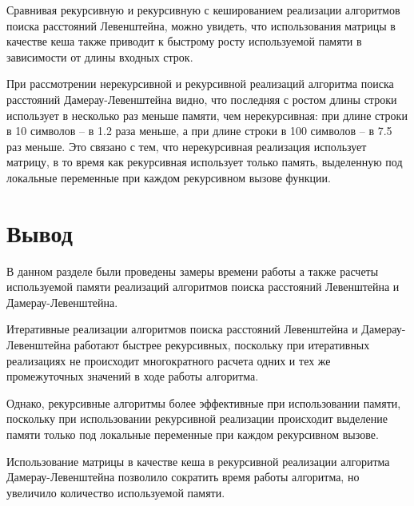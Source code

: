 Сравнивая рекурсивную и рекурсивную с кешированием реализации алгоритмов поиска расстояний Левенштейна, можно увидеть, что использования матрицы в качестве кеша также приводит к быстрому росту используемой памяти в зависимости от длины входных строк.

При рассмотрении нерекурсивной и рекурсивной реализаций алгоритма поиска расстояний Дамерау-Левенштейна видно, что последняя с ростом длины строки использует в несколько раз меньше памяти, чем нерекурсивная: при длине строки в 10 символов -- в 1.2 раза меньше, а при длине строки в 100 символов -- в 7.5 раз меньше. Это связано с тем, что нерекурсивная реализация использует матрицу, в то время как рекурсивная использует только память, выделенную под локальные переменные при каждом рекурсивном вызове функции.

\section*{Вывод}

В данном разделе были проведены замеры времени работы а также расчеты используемой памяти реализаций алгоритмов поиска расстояний Левенштейна и Дамерау-Левенштейна. 

Итеративные реализации алгоритмов поиска расстояний Левенштейна и Дамерау-Левенштейна работают быстрее рекурсивных, поскольку при итеративных реализациях не происходит многократного расчета одних и тех же промежуточных значений в ходе работы алгоритма.

Однако, рекурсивные алгоритмы более эффективные при использовании памяти, поскольку при использовании рекурсивной реализации происходит выделение памяти только под локальные переменные при каждом рекурсивном вызове.

Использование матрицы в качестве кеша в рекурсивной реализации алгоритма Дамерау-Левенштейна позволило сократить время работы алгоритма, но увеличило количество используемой памяти.

